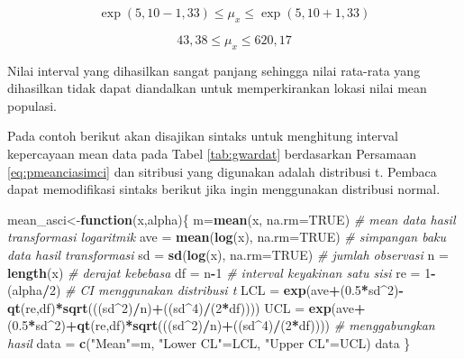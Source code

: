 \documentclass[]{book}
\newenvironment{Shaded}{\begin{snugshade}}{\end{snugshade}}
\newcommand{\KeywordTok}[1]{\textcolor[rgb]{0.13,0.29,0.53}{\textbf{#1}}}
\newcommand{\DataTypeTok}[1]{\textcolor[rgb]{0.13,0.29,0.53}{#1}}
\newcommand{\DecValTok}[1]{\textcolor[rgb]{0.00,0.00,0.81}{#1}}
\newcommand{\FloatTok}[1]{\textcolor[rgb]{0.00,0.00,0.81}{#1}}
\newcommand{\StringTok}[1]{\textcolor[rgb]{0.31,0.60,0.02}{#1}}
\newcommand{\CommentTok}[1]{\textcolor[rgb]{0.56,0.35,0.01}{\textit{#1}}}
\newcommand{\OtherTok}[1]{\textcolor[rgb]{0.56,0.35,0.01}{#1}}
\newcommand{\ControlFlowTok}[1]{\textcolor[rgb]{0.13,0.29,0.53}{\textbf{#1}}}
\newcommand{\OperatorTok}[1]{\textcolor[rgb]{0.81,0.36,0.00}{\textbf{#1}}}
\newcommand{\NormalTok}[1]{#1}
\begin{document}
\[
  \exp\left(5,10-1,33\right)\le\mu_x\le\exp\left(5,10+1,33\right)
\]

\[
  43,38\le\mu_x\le620,17
\]

Nilai interval yang dihasilkan sangat panjang sehingga nilai rata-rata
yang dihasilkan tidak dapat diandalkan untuk memperkirankan lokasi nilai
mean populasi.

Pada contoh berikut akan disajikan sintaks untuk menghitung interval
kepercayaan mean data pada Tabel \ref{tab:gwardat} berdasarkan Persamaan
\eqref{eq:pmeanciasimci} dan sitribusi yang digunakan adalah distribusi t.
Pembaca dapat memodifikasi sintaks berikut jika ingin menggunakan
distribusi normal.

\begin{Shaded}
\begin{Highlighting}[]
\NormalTok{mean_asci<-}\ControlFlowTok{function}\NormalTok{(x,alpha)\{}
\NormalTok{  m=}\KeywordTok{mean}\NormalTok{(x, }\DataTypeTok{na.rm=}\OtherTok{TRUE}\NormalTok{)}
  \CommentTok{# mean data hasil transformasi logaritmik}
\NormalTok{  ave =}\StringTok{ }\KeywordTok{mean}\NormalTok{(}\KeywordTok{log}\NormalTok{(x), }\DataTypeTok{na.rm=}\OtherTok{TRUE}\NormalTok{)}
  \CommentTok{# simpangan baku data hasil transformasi}
\NormalTok{  sd =}\StringTok{ }\KeywordTok{sd}\NormalTok{(}\KeywordTok{log}\NormalTok{(x), }\DataTypeTok{na.rm=}\OtherTok{TRUE}\NormalTok{)}
  \CommentTok{# jumlah observasi}
\NormalTok{  n =}\StringTok{ }\KeywordTok{length}\NormalTok{(x)}
  \CommentTok{# derajat kebebasa}
\NormalTok{  df =}\StringTok{ }\NormalTok{n}\OperatorTok{-}\DecValTok{1}
  \CommentTok{# interval keyakinan satu sisi}
\NormalTok{  re =}\StringTok{ }\DecValTok{1}\OperatorTok{-}\NormalTok{(alpha}\OperatorTok{/}\DecValTok{2}\NormalTok{)}
  \CommentTok{# CI menggunakan distribusi t}
\NormalTok{  LCL =}\StringTok{ }\KeywordTok{exp}\NormalTok{(ave}\OperatorTok{+}\NormalTok{(}\FloatTok{0.5}\OperatorTok{*}\NormalTok{sd}\OperatorTok{^}\DecValTok{2}\NormalTok{)}\OperatorTok{-}\KeywordTok{qt}\NormalTok{(re,df)}\OperatorTok{*}\KeywordTok{sqrt}\NormalTok{(((sd}\OperatorTok{^}\DecValTok{2}\NormalTok{)}\OperatorTok{/}\NormalTok{n)}\OperatorTok{+}\NormalTok{((sd}\OperatorTok{^}\DecValTok{4}\NormalTok{)}\OperatorTok{/}\NormalTok{(}\DecValTok{2}\OperatorTok{*}\NormalTok{df))))}
\NormalTok{  UCL =}\StringTok{ }\KeywordTok{exp}\NormalTok{(ave}\OperatorTok{+}\NormalTok{(}\FloatTok{0.5}\OperatorTok{*}\NormalTok{sd}\OperatorTok{^}\DecValTok{2}\NormalTok{)}\OperatorTok{+}\KeywordTok{qt}\NormalTok{(re,df)}\OperatorTok{*}\KeywordTok{sqrt}\NormalTok{(((sd}\OperatorTok{^}\DecValTok{2}\NormalTok{)}\OperatorTok{/}\NormalTok{n)}\OperatorTok{+}\NormalTok{((sd}\OperatorTok{^}\DecValTok{4}\NormalTok{)}\OperatorTok{/}\NormalTok{(}\DecValTok{2}\OperatorTok{*}\NormalTok{df))))}
  \CommentTok{# menggabungkan hasil}
\NormalTok{  data =}\StringTok{ }\KeywordTok{c}\NormalTok{(}\StringTok{"Mean"}\NormalTok{=m,}
            \StringTok{"Lower CL"}\NormalTok{=LCL,}
            \StringTok{"Upper CL"}\NormalTok{=UCL)}
\NormalTok{  data}
\NormalTok{\}}
\end{Highlighting}
\end{Shaded}
\end{document}
